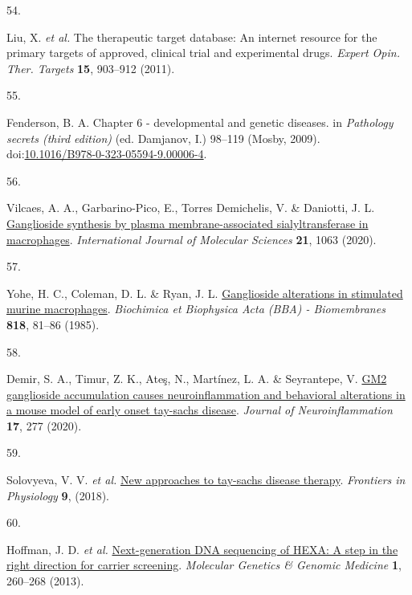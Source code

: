 \documentclass[
]{article}
\newlength{\cslhangindent}
\newlength{\csllabelwidth}
\newenvironment{CSLReferences}[2] %
 {\begin{list}{}{%
  \setlength{\itemindent}{0pt}
  \setlength{\leftmargin}{0pt}
  \setlength{\parsep}{0pt}
  \ifodd #1
   \setlength{\leftmargin}{\cslhangindent}
   \setlength{\itemindent}{-1\cslhangindent}
  \fi
  \setlength{\itemsep}{#2\baselineskip}}}
 {\end{list}}
\newcommand{\CSLLeftMargin}[1]{\parbox[t]{\csllabelwidth}{\strut#1\strut}}
\newcommand{\CSLRightInline}[1]{\parbox[t]{\linewidth - \csllabelwidth}{\strut#1\strut}}
\begin{document}
\begin{CSLReferences}{0}{0}
\CSLLeftMargin{54. }%
\CSLRightInline{Liu, X. \emph{et al.} The therapeutic target database:
An internet resource for the primary targets of approved, clinical trial
and experimental drugs. \emph{Expert Opin. Ther. Targets} \textbf{15},
903--912 (2011).}

\CSLLeftMargin{55. }%
\CSLRightInline{Fenderson, B. A. Chapter 6 - developmental and genetic
diseases. in \emph{Pathology secrets (third edition)} (ed. Damjanov, I.)
98--119 (Mosby, 2009).
doi:\href{https://doi.org/10.1016/B978-0-323-05594-9.00006-4}{10.1016/B978-0-323-05594-9.00006-4}.}

\CSLLeftMargin{56. }%
\CSLRightInline{Vilcaes, A. A., Garbarino-Pico, E., Torres Demichelis,
V. \& Daniotti, J. L.
\href{https://doi.org/10.3390/ijms21031063}{Ganglioside synthesis by
plasma membrane-associated sialyltransferase in macrophages}.
\emph{International Journal of Molecular Sciences} \textbf{21}, 1063
(2020).}

\CSLLeftMargin{57. }%
\CSLRightInline{Yohe, H. C., Coleman, D. L. \& Ryan, J. L.
\href{https://doi.org/10.1016/0005-2736(85)90141-5}{Ganglioside
alterations in stimulated murine macrophages}. \emph{Biochimica et
Biophysica Acta (BBA) - Biomembranes} \textbf{818}, 81--86 (1985).}

\CSLLeftMargin{58. }%
\CSLRightInline{Demir, S. A., Timur, Z. K., Ateş, N., Martínez, L. A. \&
Seyrantepe, V. \href{https://doi.org/10.1186/s12974-020-01947-6}{GM2
ganglioside accumulation causes neuroinflammation and behavioral
alterations in a mouse model of early onset tay-sachs disease}.
\emph{Journal of Neuroinflammation} \textbf{17}, 277 (2020).}

\CSLLeftMargin{59. }%
\CSLRightInline{Solovyeva, V. V. \emph{et al.}
\href{https://doi.org/10.3389/fphys.2018.01663}{New approaches to
tay-sachs disease therapy}. \emph{Frontiers in Physiology} \textbf{9},
(2018).}

\CSLLeftMargin{60. }%
\CSLRightInline{Hoffman, J. D. \emph{et al.}
\href{https://doi.org/10.1002/mgg3.37}{Next-generation DNA sequencing of
HEXA: A step in the right direction for carrier screening}.
\emph{Molecular Genetics \& Genomic Medicine} \textbf{1}, 260--268
(2013).}


\end{CSLReferences}
\end{document}
